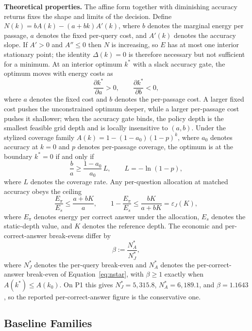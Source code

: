 \documentclass[a4paper,fleqn]{cas-sc}
\begin{document}
\textbf{Theoretical properties.} The affine form together with diminishing accuracy returns fixes the shape and limits of the decision. Define $N(k)=bA(k)-(a+bk)A'(k)$, where $b$ denotes the marginal energy per passage, $a$ denotes the fixed per-query cost, and $A'(k)$ denotes the accuracy slope. If $A'>0$ and $A''\le0$ then $N$ is increasing, so $E$ has at most one interior stationary point; the identity $\Delta(k)=0$ is therefore necessary but not sufficient for a minimum. At an interior optimum $k^{*}$ with a slack accuracy gate, the optimum moves with energy costs as
\begin{equation}\label{eq:statics}
  \frac{\partial k^{*}}{\partial a}>0,
  \qquad
  \frac{\partial k^{*}}{\partial b}<0,
\end{equation}
where $a$ denotes the fixed cost and $b$ denotes the per-passage cost. A larger fixed cost pushes the unconstrained optimum deeper, while a larger per-passage cost pushes it shallower; when the accuracy gate binds, the policy depth is the smallest feasible grid depth and is locally insensitive to $(a,b)$. Under the stylized coverage family $A(k)=1-(1-a_{0})(1-p)^{k}$, where $a_{0}$ denotes accuracy at $k=0$ and $p$ denotes per-passage coverage, the optimum is at the boundary $k^{*}=0$ if and only if
\begin{equation}\label{eq:boundary}
  \frac{b}{a}\ge\frac{1-a_{0}}{a_{0}}\,L,
  \qquad L=-\ln(1-p),
\end{equation}
where $L$ denotes the coverage rate. Any per-question allocation at matched accuracy obeys the ceiling
\begin{equation}\label{eq:price}
  \frac{E_{\pi}}{E_{s}}\le\frac{a+bK}{a},
  \qquad
  1-\frac{E_{\pi}}{E_{s}}\le\frac{bK}{a+bK}=\varepsilon_{J}(K),
\end{equation}
where $E_{\pi}$ denotes energy per correct answer under the allocation, $E_{s}$ denotes the static-depth value, and $K$ denotes the reference depth. The economic and per-correct-answer break-evens differ by
\begin{equation}\label{eq:beta}
  \beta:=\frac{N^{*}_{A}}{N^{*}_{J}},
\end{equation}
where $N^{*}_{J}$ denotes the per-query break-even and $N^{*}_{A}$ denotes the per-correct-answer break-even of Equation~\eqref{eq:nstar}, with $\beta\ge1$ exactly when $A(k^{*})\le A(k_{0})$. On P1 this gives $N^{*}_{J}=5{,}315.8$, $N^{*}_{A}=6{,}189.1$, and $\beta=1.1643$, so the reported per-correct-answer figure is the conservative one.

\subsection{Baseline Families}\label{sec:baselines}
\end{document}
